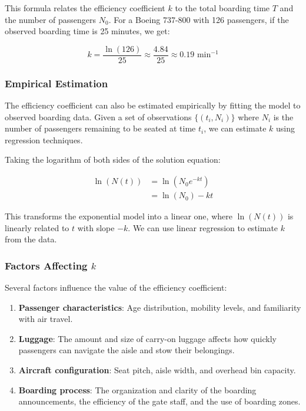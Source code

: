 \documentclass[12pt,a4paper]{article}
\begin{document}
This formula relates the efficiency coefficient $k$ to the total boarding time $T$ and the number of passengers $N_0$. For a Boeing 737-800 with 126 passengers, if the observed boarding time is 25 minutes, we get:

\begin{equation}
k = \frac{\ln(126)}{25} \approx \frac{4.84}{25} \approx 0.19 \text{ min}^{-1}
\end{equation}

\subsubsection{Empirical Estimation}

The efficiency coefficient can also be estimated empirically by fitting the model to observed boarding data. Given a set of observations $\{(t_i, N_i)\}$ where $N_i$ is the number of passengers remaining to be seated at time $t_i$, we can estimate $k$ using regression techniques.

Taking the logarithm of both sides of the solution equation:

\begin{align}
\ln(N(t)) &= \ln(N_0 e^{-kt}) \\
&= \ln(N_0) - kt
\end{align}

This transforms the exponential model into a linear one, where $\ln(N(t))$ is linearly related to $t$ with slope $-k$. We can use linear regression to estimate $k$ from the data.

\subsubsection{Factors Affecting $k$}

Several factors influence the value of the efficiency coefficient:

\begin{enumerate}
    \item \textbf{Passenger characteristics}: Age distribution, mobility levels, and familiarity with air travel.
    \item \textbf{Luggage}: The amount and size of carry-on luggage affects how quickly passengers can navigate the aisle and stow their belongings.
    \item \textbf{Aircraft configuration}: Seat pitch, aisle width, and overhead bin capacity.
    \item \textbf{Boarding process}: The organization and clarity of the boarding announcements, the efficiency of the gate staff, and the use of boarding zones.
\end{enumerate}
\end{document}

